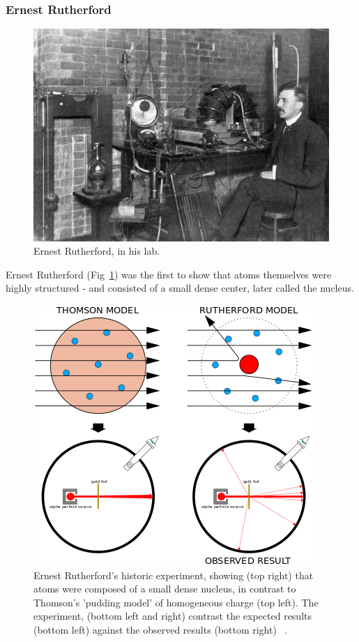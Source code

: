 \subsubsection{Ernest Rutherford}

\begin{figure}[ht]
	\centering
	\includegraphics[width=0.6\linewidth]{figures/ernestrutherford.jpg}
	\caption{Ernest Rutherford, in his lab. ~\cite{Eve1939}}
	\label{fig:rutherford}
\end{figure}

Ernest Rutherford (Fig~\ref{fig:rutherford}) was the first to show that atoms
themselves were highly structured - and consisted of a small dense center, later
called the nucleus.

\begin{figure}[ht]
	\centering
	\includegraphics[width=0.6\linewidth]{figures/geiger_marsden.png}
	\caption{
		Ernest Rutherford's historic experiment, showing (top right) that atoms were
		composed of a small dense nucleus, in contrast to Thomson's 'pudding model'
		of homogeneous charge (top left). The experiment, (bottom left and right)
		contrast the expected results (bottom left) against the observed results
		(bottom right) ~\cite{Kurzon2014}.
	}
	\label{fig:geigermarsden}
\end{figure}

